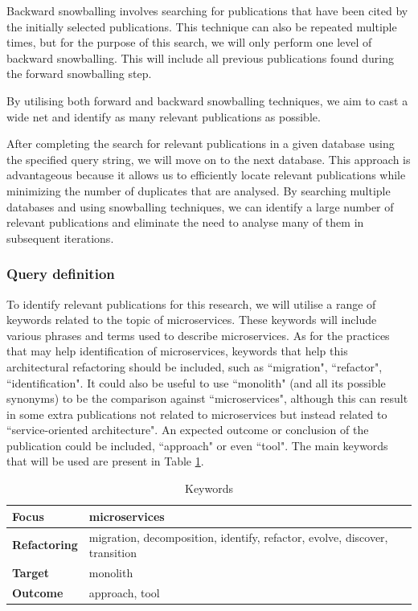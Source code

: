 \documentclass[conference]{IEEEtran}
\begin{document}
Backward snowballing involves searching for publications that have been cited
by the initially selected publications. This technique can also be repeated
multiple times, but for the purpose of this search, we will only perform one
level of backward snowballing. This will include all previous publications
found during the forward snowballing step.

By utilising both forward and backward snowballing techniques, we aim to cast a
wide net and identify as many relevant publications as possible.

After completing the search for relevant publications in a given database using
the specified query string, we will move on to the next database. This approach
is advantageous because it allows us to efficiently locate relevant
publications while minimizing the number of duplicates that are analysed. By
searching multiple databases and using snowballing techniques, we can identify
a large number of relevant publications and eliminate the need to analyse many
of them in subsequent iterations.

\subsubsection{Query definition}

To identify relevant publications for this research, we will utilise a range of
keywords related to the topic of microservices. These keywords will include
various phrases and terms used to describe microservices. As for the practices
that may help identification of microservices, keywords that help this
architectural refactoring should be included, such as ``migration",
``refactor", ``identification". It could also be useful to use ``monolith" (and
all its possible synonyms) to be the comparison against ``microservices",
although this can result in some extra publications not related to
microservices but instead related to ``service-oriented architecture". An
expected outcome or conclusion of the publication could be included,
``approach" or even ``tool". The main keywords that will be used are present in
Table \ref{tab:keywords}.

\begin{table}[!htb] \caption{Keywords} \label{tab:keywords}
  \begin{center}
    \begin{tabular}[c]{p{7em}|p{13em}} {\textbf{Focus}} & microservices \\
      \hline \textbf{Refactoring} & {migration, decomposition, identify, refactor, evolve, discover, transition } \\
      \hline \textbf{Target} & monolith \\
      \hline \textbf{Outcome} & approach, tool \\
    \end{tabular}
  \end{center}
\end{table}
\end{document}
